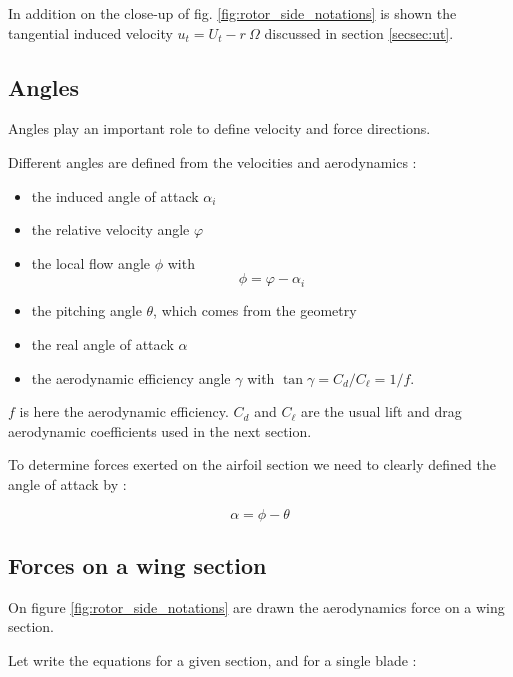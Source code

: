 In addition on the close-up of fig.  \ref{fig:rotor_side_notations} is shown the tangential induced velocity $u_t = U_t - r~\Omega$
discussed in section \ref{secsec:ut}.

\subsection{Angles}

Angles play an important role to define velocity and force directions.

Different angles are defined from the velocities and aerodynamics :
\begin{itemize}
  \item the induced angle of attack $\alpha_i$
  \item the relative velocity angle $\varphi$
  \item the local flow angle $\phi$ with 
  $$
    \phi = \varphi - \alpha_i
  $$

  \item the pitching angle $\theta$, which comes from the geometry
  \item the real angle of attack $\alpha$
  \item the aerodynamic efficiency angle $\gamma$ with $\tan \gamma = C_d/C_\ell = 1/f$.
\end{itemize}

$f$ is here the aerodynamic efficiency. $C_d$ and $C_{\ell}$ are the usual lift and drag aerodynamic 
coefficients  used in the next section.


To determine forces exerted on the airfoil section we need to clearly defined the angle of attack  by :

\begin{equation}
\alpha =  \phi-\theta
\label{eq:alpha}
\end{equation}

\subsection{Forces on a wing section}

On figure \ref{fig:rotor_side_notations} are drawn the aerodynamics force on a wing section.

Let write the equations for a given section, and for a single blade :

